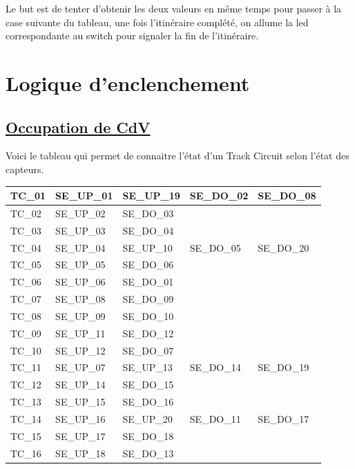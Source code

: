 Le but est de tenter d’obtenir les deux valeurs en même temps pour
passer à la case suivante du tableau, une fois l’itinéraire complété,
on  allume la led correspondante au switch pour signaler la fin de
l’itinéraire. 



\section{Logique d'enclenchement}
\label{sec:logic}
\subsection{\underline{Occupation de CdV}}
\label{sec:cdv_occ}

Voici le tableau qui permet de connaitre l'état d'un Track Circuit
selon l'état des capteurs.

\begin{center}
\begin{tabular}{|l||llll|}
  \hline
  TC\_01 & SE\_UP\_01 & SE\_UP\_19 & SE\_DO\_02 & SE\_DO\_08 \\
  \hline
  TC\_02 & SE\_UP\_02 & SE\_DO\_03 & & \\
  \hline
  TC\_03 & SE\_UP\_03 & SE\_DO\_04 & & \\
  \hline
  TC\_04 & SE\_UP\_04 & SE\_UP\_10 & SE\_DO\_05 & SE\_DO\_20 \\
  \hline
  TC\_05 & SE\_UP\_05 & SE\_DO\_06 & & \\
  \hline
  TC\_06 & SE\_UP\_06 & SE\_DO\_01 & & \\
  \hline
  TC\_07 & SE\_UP\_08 & SE\_DO\_09 & & \\
  \hline
  TC\_08 & SE\_UP\_09 & SE\_DO\_10 & & \\
  \hline
  TC\_09 & SE\_UP\_11 & SE\_DO\_12 & & \\
  \hline
  TC\_10 & SE\_UP\_12 & SE\_DO\_07 & & \\
  \hline
  TC\_11 & SE\_UP\_07 & SE\_UP\_13 & SE\_DO\_14 & SE\_DO\_19 \\
  \hline
  TC\_12 & SE\_UP\_14 & SE\_DO\_15 & & \\
  \hline
  TC\_13 & SE\_UP\_15 & SE\_DO\_16 & & \\
  \hline
  TC\_14 & SE\_UP\_16 & SE\_UP\_20 & SE\_DO\_11 & SE\_DO\_17 \\
  \hline
  TC\_15 & SE\_UP\_17 & SE\_DO\_18 & & \\
  \hline
  TC\_16 & SE\_UP\_18 & SE\_DO\_13 & & \\
  \hline
\end{tabular}
\end{center}

